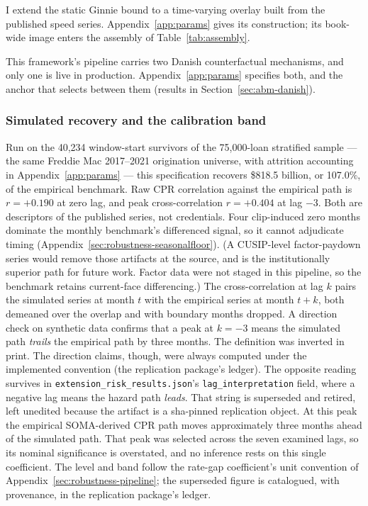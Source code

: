 \documentclass[12pt]{article}
\begin{document}
I extend the static Ginnie bound to a time-varying overlay built from the published speed series. Appendix~\ref{app:params} gives its construction; its book-wide image enters the assembly of Table~\ref{tab:assembly}.

This framework's pipeline carries two Danish counterfactual mechanisms, and only one is live in production. Appendix~\ref{app:params} specifies both, and the anchor that selects between them (results in Section~\ref{sec:abm-danish}).

\subsubsection{Simulated recovery and the calibration band}

Run on the 40,234 window-start survivors of the 75,000-loan stratified sample --- the same Freddie Mac 2017--2021 origination universe, with attrition accounting in Appendix~\ref{app:params} --- this specification recovers \$818.5 billion, or 107.0\%, of the empirical benchmark. Raw CPR correlation against the empirical path is $r = +0.190$ at zero lag, and peak cross-correlation $r = +0.404$ at lag $-3$. Both are descriptors of the published series, not credentials. Four clip-induced zero months dominate the monthly benchmark's differenced signal, so it cannot adjudicate timing (Appendix~\ref{sec:robustness-seasonalfloor}). (A CUSIP-level factor-paydown series would remove those artifacts at the source, and is the institutionally superior path for future work. Factor data were not staged in this pipeline, so the benchmark retains current-face differencing.) The cross-correlation at lag $k$ pairs the simulated series at month $t$ with the empirical series at month $t+k$, both demeaned over the overlap and with boundary months dropped. A direction check on synthetic data confirms that a peak at $k=-3$ means the simulated path \emph{trails} the empirical path by three months. The definition was inverted in print. The direction claims, though, were always computed under the implemented convention (the replication package's ledger). The opposite reading survives in \texttt{extension\_risk\_results.json}'s \texttt{lag\_interpretation} field, where a negative lag means the hazard path \emph{leads}. That string is superseded and retired, left unedited because the artifact is a sha-pinned replication object. At this peak the empirical SOMA-derived CPR path moves approximately three months ahead of the simulated path. That peak was selected across the seven examined lags, so its nominal significance is overstated, and no inference rests on this single coefficient. The level and band follow the rate-gap coefficient's unit convention of Appendix~\ref{sec:robustness-pipeline}; the superseded figure is catalogued, with provenance, in the replication package's ledger.
\end{document}
